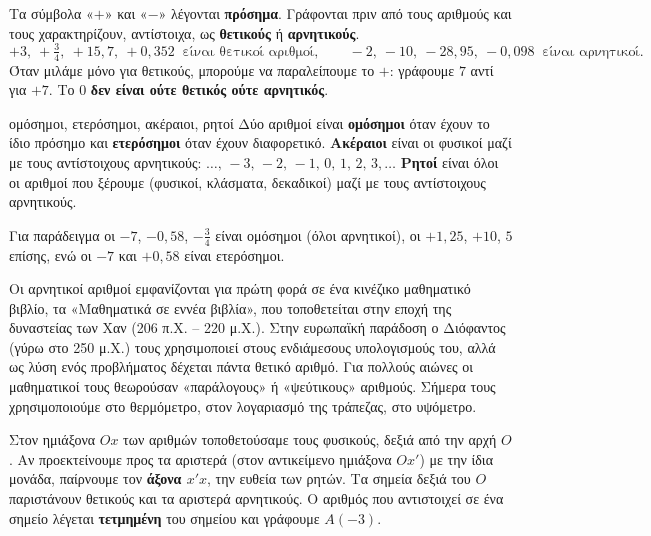 
Τα σύμβολα «$+$» και «$-$» λέγονται \textbf{πρόσημα}. Γράφονται πριν από τους αριθμούς και τους χαρακτηρίζουν, αντίστοιχα, ως \textbf{θετικούς} ή \textbf{αρνητικούς}.
$$+3,\ +\tfrac{3}{4},\ +15{,}7,\ +0{,}352\ \text{ είναι θετικοί αριθμοί},\qquad -2,\ -10,\ -28{,}95,\ -0{,}098\ \text{ είναι αρνητικοί}.$$
Όταν μιλάμε μόνο για θετικούς, μπορούμε να παραλείπουμε το $+$: γράφουμε $7$ αντί για $+7$. Το $0$ \textbf{δεν είναι ούτε θετικός ούτε αρνητικός}.

\begin{orismos}{ομόσημοι, ετερόσημοι, ακέραιοι, ρητοί}
Δύο αριθμοί είναι \textbf{ομόσημοι} όταν έχουν το ίδιο πρόσημο και \textbf{ετερόσημοι} όταν έχουν διαφορετικό. \textbf{Ακέραιοι} είναι οι φυσικοί μαζί με τους αντίστοιχους αρνητικούς: $\dots,\,-3,\,-2,\,-1,\,0,\,1,\,2,\,3,\dots$ \textbf{Ρητοί} είναι όλοι οι αριθμοί που ξέρουμε (φυσικοί, κλάσματα, δεκαδικοί) μαζί με τους αντίστοιχους αρνητικούς.
\end{orismos}

Για παράδειγμα οι $-7$, $-0{,}58$, $-\frac{3}{4}$ είναι ομόσημοι (όλοι αρνητικοί), οι $+1{,}25$, $+10$, $5$ επίσης, ενώ οι $-7$ και $+0{,}58$ είναι ετερόσημοι.


Οι αρνητικοί αριθμοί εμφανίζονται για πρώτη φορά σε ένα κινέζικο μαθηματικό βιβλίο, τα «Μαθηματικά σε εννέα βιβλία», που τοποθετείται στην εποχή της δυναστείας των Χαν (206 π.Χ. -- 220 μ.Χ.). Στην ευρωπαϊκή παράδοση ο Διόφαντος (γύρω στο 250 μ.Χ.) τους χρησιμοποιεί στους ενδιάμεσους υπολογισμούς του, αλλά ως λύση ενός προβλήματος δέχεται πάντα θετικό αριθμό. Για πολλούς αιώνες οι μαθηματικοί τους θεωρούσαν «παράλογους» ή «ψεύτικους» αριθμούς. Σήμερα τους χρησιμοποιούμε στο θερμόμετρο, στον λογαριασμό της τράπεζας, στο υψόμετρο.


Στον ημιάξονα $Ox$ των αριθμών τοποθετούσαμε τους φυσικούς, δεξιά από την αρχή $O$. Αν προεκτείνουμε προς τα αριστερά (στον αντικείμενο ημιάξονα $Ox'$) με την ίδια μονάδα, παίρνουμε τον \textbf{άξονα $x'x$}, την ευθεία των ρητών. Τα σημεία δεξιά του $O$ παριστάνουν θετικούς και τα αριστερά αρνητικούς. Ο αριθμός που αντιστοιχεί σε ένα σημείο λέγεται \textbf{τετμημένη} του σημείου και γράφουμε $A(-3)$.

\begin{center}
\end{center}


